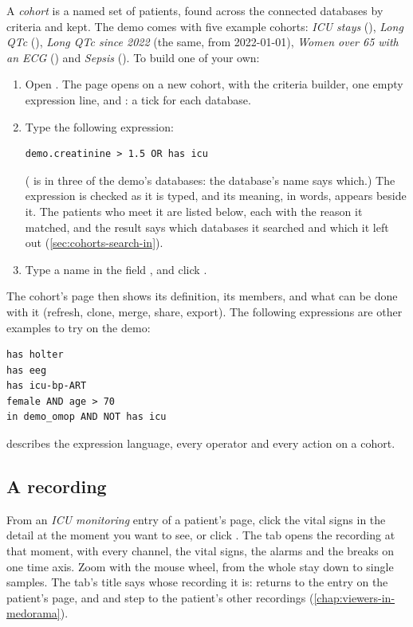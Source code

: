 A \emph{cohort} is a named set of patients, found across the connected databases by criteria
and kept. The demo comes with five example cohorts: \emph{ICU stays} (), \emph{Long
QTc} (), \emph{Long QTc since 2022} (the same, from 2022-01-01),
\emph{Women over 65 with an ECG} () and \emph{Sepsis} (). To build one of your own:
\begin{enumerate}
\item Open . The page opens on a new cohort, with the criteria builder, one empty
  expression line, and : a tick for each database.
\item Type the following expression:
\begin{lstlisting}[style=text]
demo.creatinine > 1.5 OR has icu
\end{lstlisting}
  ( is in three of the demo's databases: the database's name says which.) The expression is checked as it is typed, and its meaning, in words, appears beside it. The
  patients who meet it are listed below, each with the reason it matched, and the result says
  which databases it searched and which it left out (\cref{sec:cohorts-search-in}).
\item Type a name in the field , and click .
\end{enumerate}
The cohort's page then shows its definition, its members, and what can be done with it
(refresh, clone, merge, share, export). The following expressions are other examples to try on
the demo:
\begin{lstlisting}[style=text]
has holter
has eeg
has icu-bp-ART
female AND age > 70
in demo_omop AND NOT has icu
\end{lstlisting}
 describes the expression language, every operator and every action on a
cohort.

\subsection{A recording}
\label{sec:quickstart-recording}

From an \emph{ICU monitoring} entry of a patient's page, click the vital signs in the detail at
the moment you want to see, or click . The  tab opens the
recording at that moment, with every channel, the vital signs, the alarms and the breaks on one
time axis. Zoom with the mouse wheel, from the whole stay down to single samples. The tab's
title says whose recording it is:  returns to the entry on the patient's
page, and \ui{$\langle$} and \ui{$\rangle$} step to the patient's other recordings
(\cref{chap:viewers-in-medorama}).

